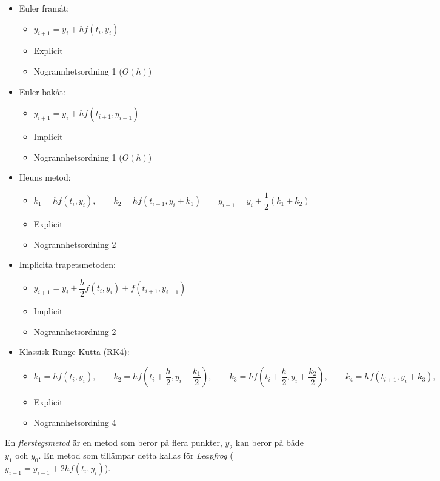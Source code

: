 \begin{itemize}
  \item Euler framåt:
    \begin{itemize}
      \item $y_{i+1}=y_i+hf(t_i,y_i)$
      \item Explicit
      \item Nogrannhetsordning 1 ($O(h)$)
    \end{itemize}
  \item Euler bakåt:
    \begin{itemize}
      \item $y_{i+1}=y_i+hf(t_{i+1},y_{i+1})$
      \item Implicit
      \item Nogrannhetsordning 1 ($O(h)$)
    \end{itemize}
  \item Heuns metod:
    \begin{itemize}
      \item $k_1 = hf(t_i,y_i),\qquad k_2 = hf(t_{i+1},y_i+k_1)\qquad y_{i+1}=y_i+\dfrac{1}{2}(k_1+k_2)$
      \item Explicit
        \item Nogrannhetsordning 2
    \end{itemize}
  \item Implicita trapetsmetoden:
    \begin{itemize}
      \item $y_{i+1}=y_i+\dfrac{h}{2}f(t_i,y_i)+f(t_{i+1},y_{i+1})$
      \item Implicit
      \item Nogrannhetsordning 2
    \end{itemize}
  \item Klassisk Runge-Kutta (RK4):
    \begin{itemize}
      \item $k_1 = hf(t_i,y_i),\qquad k_2 = hf(t_i+\dfrac{h}{2},y_i+\dfrac{k_1}{2}),\qquad k_3 = hf(t_i+\dfrac{h}{2}, y_i+\dfrac{k_2}{2}),\qquad k_4 = hf(t_{i+1},y_i+k_3),\qquad y_{i+1}=y_i0\dfrac{1}{6}(k_1+2k_2+2k_3+k_4)$
      \item Explicit
      \item Nogrannhetsordning 4
    \end{itemize}
\end{itemize}
\par\bigskip
\noindent En \textit{flerstegsmetod} är en metod som beror på flera punkter, $y_2$ kan beror på både $y_1$ och $y_0$. En metod som tillämpar detta kallas för \textit{Leapfrog} ($y_{i+1}=y_{i-1}+2hf(t_i,y_i)$).
\par\bigskip
